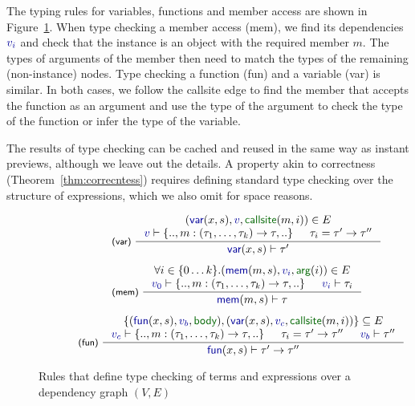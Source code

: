 \documentclass[english,crc]{programming}
\theoremstyle{plain}
\theoremstyle{definition}
\newcommand{\bndclr}[1]{\textcolor{kvdclr}{#1}}
\newcommand{\bnd}[1]{\textnormal{\textcolor{kvdclr}{\sffamily #1}}}
\newcommand{\blbl}[1]{\textnormal{\textcolor{numclr}{\sffamily #1}}}
\newcommand{\rname}[1]{{\sffamily(#1)}}
\begin{document}
The typing rules for variables, functions and member access are shown in Figure~\ref{fig:tc}.
When type checking a member access \rname{mem}, we find its dependencies $\bndclr{v_i}$ and
check that the instance is an object with the required member $m$. The types of arguments of the
member then need to match the types of the remaining (non-instance) nodes.
Type checking a function \rname{fun} and a variable \rname{var} is similar. In both cases,
we follow the \blbl{callsite} edge to find the member that accepts the function as an argument
and use the type of the argument to check the type of the function or infer the type of the
variable.

The results of type checking can be cached and reused in the same way as instant previews, although
we leave out the details. A property akin to correctness (Theorem~\ref{thm:correcntess})
requires defining standard type checking over the structure of expressions, which we also
omit for space reasons.


\begin{figure}
\begin{equation*}
\hspace{-1em}
\begin{array}{l}
\hspace{7em}\inference[\rname{var}~]
  { (\bnd{var}(x,s), \bndclr{v}, \blbl{callsite}(m, i)) \in E \\
    \bndclr{v} \vdash \{.., m:(\tau_1, \ldots, \tau_k)\rightarrow \tau,..\} & \tau_i=\tau'\rightarrow\tau'' }
  { \bnd{var}(x, s) \vdash \tau' }
\\[1.5em]
\hspace{7em}\inference[\rname{mem}~]
  { \forall i\in\{0\ldots k\}.(\bnd{mem}(m, s), \bndclr{v_i}, \blbl{arg}(i)) \in E \\
  \bndclr{v_0} \vdash \{.., m:(\tau_1, \ldots, \tau_k) \rightarrow \tau, ..\} & \bndclr{v_i} \vdash \tau_i }
  { \bnd{mem}(m, s) \vdash \tau }
\\[1.5em]
\hspace{4em}\inference[\rname{fun}~]
  { \{(\bnd{fun}(x,s), \bndclr{v_b}, \blbl{body}), (\bnd{var}(x,s), \bndclr{v_c}, \blbl{callsite}(m, i))\} \subseteq E \\
    \bndclr{v_c} \vdash \{.., m:(\tau_1, \ldots, \tau_k)\rightarrow \tau,..\} &
    \tau_i=\tau'\rightarrow\tau'' & \bndclr{v_b} \vdash \tau'' }
  { \bnd{fun}(x, s) \vdash \tau' \rightarrow \tau'' }
\end{array}
\end{equation*}
\vspace{-0.5em}
\caption{Rules that define type checking of terms and expressions over a dependency graph $(V, E)$}
\label{fig:tc}
\vspace{-0.5em}
\end{figure}
\end{document}

